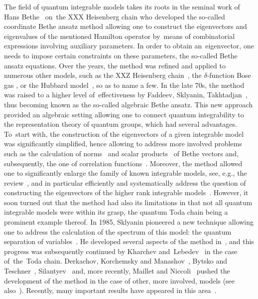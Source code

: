 \documentclass[pdftex]{sigma}%
\numberwithin{equation}{section}
\begin{document}
The field of quantum integrable models takes its roots in the seminal work of Hans Bethe~\cite{BetheSolutionToXXX} on~the XXX Heisenberg
chain who developed the so-called coordinate Bethe ansatz method allowing one to construct the eigenvectors and eigenvalues of the
mentioned Hamilton operator by~means of combinatorial expressions involving auxiliary parameters. In order to obtain an~eigen\-vector, one
needs to impose certain constraints on these parameters, the so-called Bethe ansatz equations. Over the years, the method was refined and
applied to numerous other models, such as the XXZ Heisenberg chain~\cite{OrbachXXZCBASolution}, the $\delta$-function Bose gas
\cite{LiebLinigerCBAForDeltaBoseGas}, or the Hubbard model~\cite{LiebWuFirstDerivationOfLIE4Hubbard1D}, so as to name a few. In the late
70s, the method was raised to a higher level of~effec\-tiveness by Faddeev, Sklyanin, Takhtadjan~\cite{Faddeev:1979gh}, thus becoming known
as the so-called algebraic Bethe ansatz. This new approach provided an algebraic setting allowing one to connect quantum integrability to
the representation theory of quantum groups, which had several advantages. To~start with, the construction of the eigenvectors of a given
integrable model was significantly simplified, hence allowing to address more involved problems such as the calculation of norms~\cite{KorepinNormBetheStates6-Vertex} and scalar products~\cite{SlavnovScalarProductsXXZ} of Bethe vectors and, subsequently, the one of
correlation functions~\cite{IzerginKorepinQISMApproachToCorrFns2SiteModel,KitanineMailletTerrasElementaryBlocksPeriodicXXZ}. Moreover, the
method allowed one to significantly enlarge the family of known integrable models, see, e.g., the review~\cite{KulishSklyaninListOfSolutionsYBEexistentesEn82}, and in particular efficiently and systematically add\-ress the question of
constructing the eigenvectors of the higher rank integrable models~\cite{KulishReshetikhinNestedBASomeGeneralisationstoGL(N)Reps}. However,
it soon turned out that the method had also its limitations in that not all quantum integrable models were within its grasp, the quantum
Toda chain being a prominent example thereof. In 1985, Sklyanin pioneered a new technique allowing one to address the calculation of the
spectrum of this model: the quantum separation of variables~\cite{MR1239668}. He developed several aspects of the method in~\cite{SklyaninSoVGeneralOverviewFuncBA,MR1239668}, and this progress was subsequently continued by Kharchev and~Lebedev~\cite{KharchevLebedevIntRepEigenfctsPeriodicTodaFromWhittakerFctRep,Kharchev:2000yj}
in the case of~the~Toda chain. Derkachov, Korchemsky and Manashov~\cite{DerkachovKorchemskyManashovXXXSoVandQopNewConstEigenfctsBOp,Derkachov:2003qb}, Bytsko and Teschner~\cite{BytskoTeschnerSinhGordonFunctionalBA}, Silantyev~\cite{MR2340732} and, more recently, Maillet and Niccoli~\cite{MailletNiccoliNewQSoVIntoruction} pushed the development of the method in the case of other, more involved, models (see also~\cite{Gromov:2016itr, Ryan:2018fyo,Ryan:2020rfk}). Recently, many important results have appeared in this area~\cite{Cavaglia:2019pow,Gromov:2020fwh,Gromov:2019wmz,Maillet:2019nsy,Maillet:2020ykb}.
\end{document}

